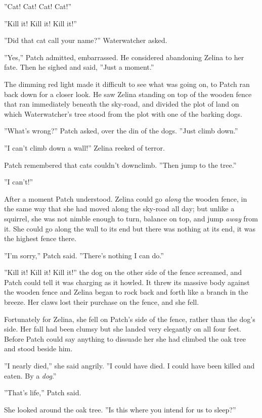 \documentclass[12pt]{book}
\begin{document}
''Cat! Cat! Cat! Cat!''

''Kill it! Kill it! Kill it!''

''Did that cat call your name?'' Waterwatcher asked.

''Yes,'' Patch admitted, embarrassed. He considered abandoning Zelina to her fate. Then he sighed and said, ''Just a moment.''

The dimming red light made it difficult to see what was going on, to Patch ran back down for a closer look. He saw Zelina standing on top of the wooden fence that ran immediately beneath the sky-road, and divided the plot of land on which Waterwatcher's tree stood from the plot with one of the barking dogs.

''What's wrong?'' Patch asked, over the din of the dogs. ''Just climb down.''

''I can't climb down a wall!'' Zelina reeked of terror.

Patch remembered that cats couldn't downclimb. ''Then jump to the tree.''

''I can't!''

After a moment Patch understood. Zelina could go {\it along} the wooden fence, in the same way that she had moved along the sky-road all day; but unlike a squirrel, she was not nimble enough to turn, balance on top, and jump {\it away} from it. She could go along the wall to its end %
but there was nothing at its end, it was the highest fence there.

''I'm sorry,'' Patch said. ''There's nothing I can do.''

''Kill it! Kill it! Kill it!'' the dog on the other side of the fence screamed, and Patch could tell it was charging as it howled. It threw its massive body against the wooden fence and Zelina began to rock back and forth like a branch in the breeze. Her claws lost their purchase on the fence, and she fell.

Fortunately for Zelina, she fell on Patch's side of the fence, rather than the dog's side. Her fall had been clumsy but she landed very elegantly on all four feet. Before Patch could say anything to dissuade her she had climbed the oak tree and stood beside him.

''I nearly died,'' she said angrily. ''I could have died. I could have been killed and eaten. By a {\it dog}.''

''That's life,'' Patch said.

She looked around the oak tree. ''Is this where you intend for us to sleep?''
\end{document}
